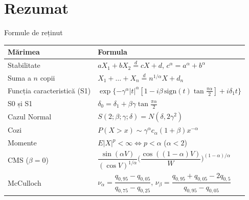 \section{Rezumat}

\begin{frame}{Formule de reținut}
\itemsize{\small}
{\renewcommand{\arraystretch}{1.45}\begin{center}
\scriptsize
\begin{tabular}{ll}
\toprule
\textbf{Mărimea} & \textbf{Formula} \\
\midrule
Stabilitate & $aX_1 + bX_2 \overset{d}{=} cX + d$, \quad $c^\alpha = a^\alpha + b^\alpha$ \\
Suma a $n$ copii & $X_1 + \dots + X_n \overset{d}{=} n^{1/\alpha}X + d_n$ \\
Funcția caracteristică (S1) & $\exp\{-\gamma^\alpha|t|^\alpha[1 - i\beta\,\mathrm{sign}(t)\tan\frac{\pi\alpha}{2}] + i\delta_1 t\}$ \\
S0 și S1 & $\delta_0 = \delta_1 + \beta\gamma\tan\frac{\pi\alpha}{2}$ \\
Cazul Normal & $S(2; \beta; \gamma; \delta) = N(\delta, 2\gamma^2)$ \\
Cozi & $P(X > x) \sim \gamma^\alpha c_\alpha(1 + \beta)x^{-\alpha}$ \\
Momente & $E|X|^p < \infty \iff p < \alpha$ \quad ($\alpha < 2$) \\
CMS ($\beta = 0$) & $\dfrac{\sin(\alpha V)}{(\cos V)^{1/\alpha}}\Big(\dfrac{\cos((1-\alpha)V)}{W}\Big)^{(1-\alpha)/\alpha}$ \\
McCulloch & $\nu_\alpha = \dfrac{q_{0{,}95} - q_{0{,}05}}{q_{0{,}75} - q_{0{,}25}}$, \quad $\nu_\beta = \dfrac{q_{0{,}95} + q_{0{,}05} - 2q_{0{,}5}}{q_{0{,}95} - q_{0{,}05}}$ \\
\bottomrule
\end{tabular}
\end{center}
}
\end{frame}

